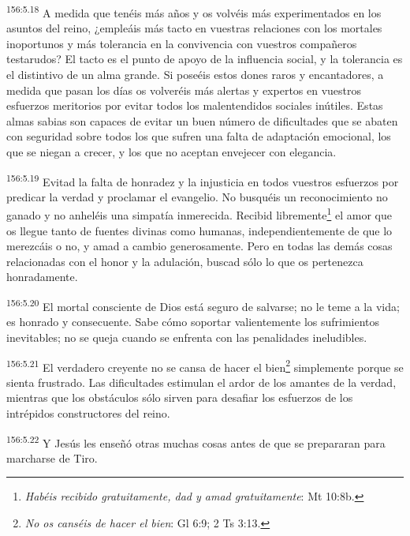 \par 
\textsuperscript{156:5.18} A medida que tenéis más años y os volvéis más experimentados en los asuntos del reino, ¿empleáis más tacto en vuestras relaciones con los mortales inoportunos y más tolerancia en la convivencia con vuestros compañeros testarudos? El tacto es el punto de apoyo de la influencia social, y la tolerancia es el distintivo de un alma grande. Si poseéis estos dones raros y encantadores, a medida que pasan los días os volveréis más alertas y expertos en vuestros esfuerzos meritorios por evitar todos los malentendidos sociales inútiles. Estas almas sabias son capaces de evitar un buen número de dificultades que se abaten con seguridad sobre todos los que sufren una falta de adaptación emocional, los que se niegan a crecer, y los que no aceptan envejecer con elegancia.

\par 
\textsuperscript{156:5.19} Evitad la falta de honradez y la injusticia en todos vuestros esfuerzos por predicar la verdad y proclamar el evangelio. No busquéis un reconocimiento no ganado y no anheléis una simpatía inmerecida. Recibid libremente\footnote{\textit{Habéis recibido gratuitamente, dad y amad gratuitamente}: Mt 10:8b.} el amor que os llegue tanto de fuentes divinas como humanas, independientemente de que lo merezcáis o no, y amad a cambio generosamente. Pero en todas las demás cosas relacionadas con el honor y la adulación, buscad sólo lo que os pertenezca honradamente.

\par 
\textsuperscript{156:5.20} El mortal consciente de Dios está seguro de salvarse; no le teme a la vida; es honrado y consecuente. Sabe cómo soportar valientemente los sufrimientos inevitables; no se queja cuando se enfrenta con las penalidades ineludibles.

\par 
\textsuperscript{156:5.21} El verdadero creyente no se cansa de hacer el bien\footnote{\textit{No os canséis de hacer el bien}: Gl 6:9; 2 Ts 3:13.} simplemente porque se sienta frustrado. Las dificultades estimulan el ardor de los amantes de la verdad, mientras que los obstáculos sólo sirven para desafiar los esfuerzos de los intrépidos constructores del reino.

\par 
\textsuperscript{156:5.22} Y Jesús les enseñó otras muchas cosas antes de que se prepararan para marcharse de Tiro.

